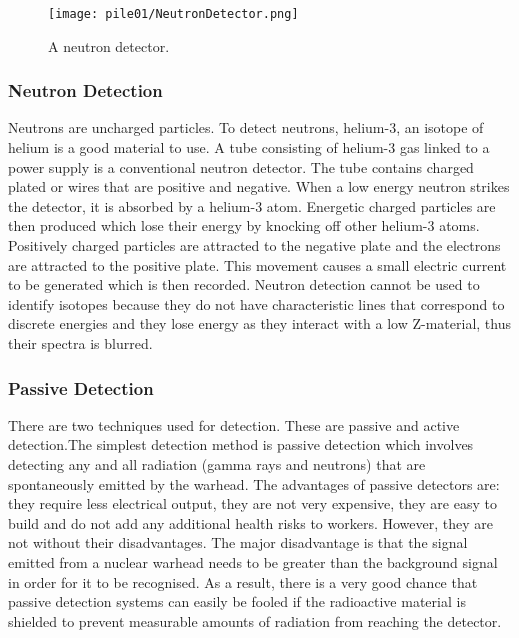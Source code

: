 \documentclass[twoside,titlepage,11pt,twocolumn,a4paper]{article}
\begin{document}
\begin{figure}
  \texttt{[image: pile01/NeutronDetector.png]}
  \caption{A neutron detector. \citep{nucsafe}}
\end{figure}

\subsubsection{Neutron Detection}

Neutrons are uncharged particles. To detect neutrons, helium-3, an
isotope of helium is a good material to use. A tube consisting of
helium-3 gas linked to a power supply is a conventional neutron
detector. The tube contains charged plated or wires that are positive
and negative. When a low energy neutron strikes the detector, it is
absorbed by a helium-3 atom.  Energetic charged particles are then
produced which lose their energy by knocking off other helium-3
atoms. Positively charged particles are attracted to the negative
plate and the electrons are attracted to the positive plate. This
movement causes a small electric current to be generated which is then
recorded. Neutron detection cannot be used to identify isotopes
because they do not have characteristic lines that correspond to
discrete energies and they lose energy as they interact with a low
Z-material, thus their spectra is blurred. \citep{medalia2007, bushberg1994}

\subsubsection{Passive Detection}

There are two techniques used for detection. These are passive and
active detection.The simplest detection method is passive detection
which involves detecting any and all radiation (gamma rays and
neutrons) that are spontaneously emitted by the
warhead. \citep{hippel1990} The advantages of passive detectors are:
they require less electrical output, they are not very expensive, they
are easy to build and do not add any additional health risks to
workers. However, they are not without their disadvantages. The major
disadvantage is that the signal emitted from a nuclear warhead needs
to be greater than the background signal in order for it to be
recognised. As a result, there is a very good chance that passive
detection systems can easily be fooled if the radioactive material is
shielded to prevent measurable amounts of radiation from reaching the
detector. \citep{nuclearDetArch2009}
\end{document}

